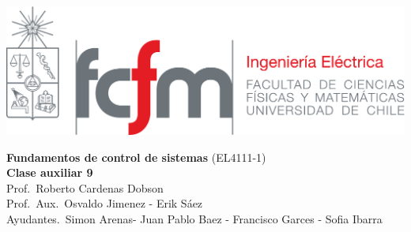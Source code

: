 \documentclass[
  11pt,
  letterpaper,
   addpoints,
  ]{exam}
\begin{document}
\noindent
\begin{minipage}{0.47\textwidth}
\includegraphics[width=\textwidth]{../fcfm_die}
\end{minipage}
\begin{minipage}{0.53\textwidth}
\begin{center} 
\large\textbf{Fundamentos de control de sistemas} (EL4111-1) \\
\large\textbf{Clase auxiliar 9} \\
\small Prof.~Roberto Cardenas Dobson\\
\small Prof.~Aux.~Osvaldo Jimenez - Erik Sáez\\
\small Ayudantes.~Simon Arenas- Juan Pablo Baez - Francisco Garces - Sofia Ibarra\\
\end{center}
\end{minipage}

\vspace{0.5cm}
\noindent
\vspace{.85cm}
\end{document}
